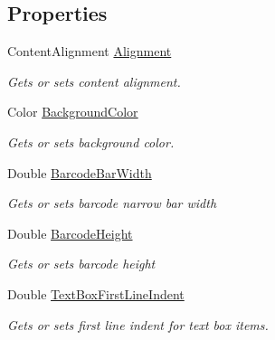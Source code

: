 \subsection*{Properties}
\begin{DoxyCompactItemize}
\item 
Content\+Alignment \hyperlink{class_pdf_file_writer_1_1_pdf_table_style_a07f8249b8fb4f198fc637f8125b4fe4b}{Alignment}
\begin{DoxyCompactList}\small\item\em Gets or sets content alignment. \end{DoxyCompactList}\item 
Color \hyperlink{class_pdf_file_writer_1_1_pdf_table_style_af43917b38ac7437311cd87edb6c874a2}{Background\+Color}
\begin{DoxyCompactList}\small\item\em Gets or sets background color. \end{DoxyCompactList}\item 
Double \hyperlink{class_pdf_file_writer_1_1_pdf_table_style_af764f91e2e5449d206303df707608b00}{Barcode\+Bar\+Width}
\begin{DoxyCompactList}\small\item\em Gets or sets barcode narrow bar width \end{DoxyCompactList}\item 
Double \hyperlink{class_pdf_file_writer_1_1_pdf_table_style_ad41e21ccbd1a440079833c972d694046}{Barcode\+Height}
\begin{DoxyCompactList}\small\item\em Gets or sets barcode height \end{DoxyCompactList}\item 
Double \hyperlink{class_pdf_file_writer_1_1_pdf_table_style_a41d2022f46b2c126692097b0b24257b2}{Text\+Box\+First\+Line\+Indent}
\begin{DoxyCompactList}\small\item\em Gets or sets first line indent for text box items. \end{DoxyCompactList}\item 

\end{DoxyCompactItemize}
